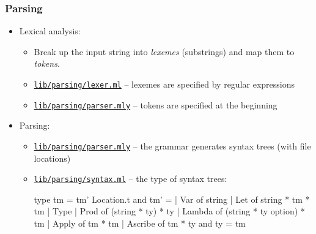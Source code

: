 \documentclass[10pt,aspectratio=169]{beamer}
\newcommand{\codeRef}[1]{\href{https://github.com/andrejbauer/faux-type-theory/blob/main/monadic-fauxtt/#1}{\texttt{#1}}}
\begin{document}
\begin{frame}[fragile]
  \frametitle{Parsing}

  \begin{itemize}
  \item Lexical analysis:
    \begin{itemize}
    \item Break up the input string into \emph{lexemes} (substrings) and map them to \emph{tokens}.
    \item \codeRef{lib/parsing/lexer.ml} -- lexemes are specified by regular expressions
    \item \codeRef{lib/parsing/parser.mly} -- tokens are specified at the beginning
    \end{itemize}
  \item \pause Parsing:
    \begin{itemize}
    \item \codeRef{lib/parsing/parser.mly} -- the grammar generates syntax trees (with file locations)
    \item \codeRef{lib/parsing/syntax.ml} -- the type of syntax trees:
\begin{ocamllisting}
type tm = tm' Location.t
and tm' =
  | Var of string
  | Let of string * tm * tm
  | Type
  | Prod of (string * ty) * ty
  | Lambda of (string * ty option) * tm
  | Apply of tm * tm
  | Ascribe of tm * ty
and ty = tm
\end{ocamllisting}
    \end{itemize}
  \end{itemize}


\end{frame}
\end{document}
